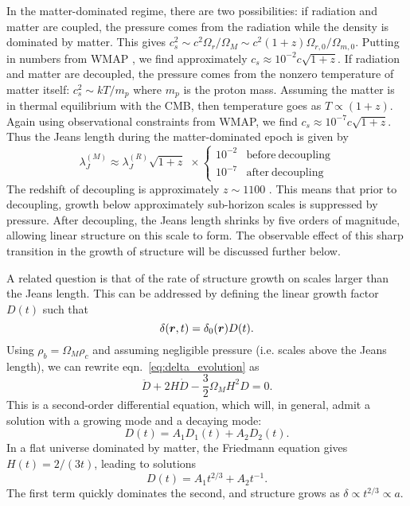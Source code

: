 In the matter-dominated regime, there are two possibilities: if radiation and
matter are coupled, the pressure comes from the radiation
while the density is dominated by matter.  This gives
$c_s^2 \sim c^2 \Omega_r / \Omega_M \sim c^2 (1 + z)
\Omega_{r,0}/\Omega_{m, 0}$.
Putting in numbers from WMAP \citep{WMAP7}, we find approximately
$c_s \approx 10^{-2} c \sqrt{1 + z}$.
If radiation and matter are decoupled, the pressure comes from the nonzero
temperature of matter itself:
$c_s^2 \sim kT/m_p$ where $m_p$ is the proton mass.  Assuming the matter
is in thermal equilibrium with the CMB, then temperature goes as
$T \propto (1 + z)$.  Again using observational constraints from WMAP, we find
$c_s \approx 10^{-7} c \sqrt{1 + z}$.  Thus the Jeans length during the
matter-dominated epoch is given by
\begin{equation}
  \label{eq:jeans_matter}
  \lambda_J^{(M)} \approx \lambda_J^{(R)}\sqrt{1 + z}\,\, \times \left\{
  \begin{array}{ll}
    10^{-2} & \mathrm{before\ decoupling}\\
    10^{-7} & \mathrm{after\ decoupling}
  \end{array}
  \right.
\end{equation}
The redshift of decoupling is approximately $z \sim 1100$ \citep[for a physical
argument for this, see][]{ryden2003cosmology}.  This means that prior to
decoupling, growth below approximately sub-horizon scales is suppressed by
pressure.  After decoupling, the Jeans length shrinks by five orders of
magnitude, allowing linear structure on this scale to form.  The observable
effect of this sharp transition in the growth of structure will be discussed
further below.

A related question is that of the rate of structure growth
on scales larger than the Jeans length. 
This can be addressed by defining the linear growth
factor $D(t)$ such that
\begin{equation}
  \label{eq:linear_growth_def}
  \delta(\boldsymbol{r}, t) = \delta_0(\boldsymbol{r})D(t).
\end{equation}
Using $\rho_b = \Omega_M\rho_c$ and assuming negligible pressure (i.e. scales
above the Jeans length), we can rewrite
eqn.~\ref{eq:delta_evolution} as
\begin{equation}
  \label{eq:linear_growth_eqn}
  \ddot{D} + 2H\dot{D} - \frac{3}{2}\Omega_M H^2D = 0.
\end{equation}
This is a second-order differential equation, which will, in general,
admit a solution with a growing mode and a decaying mode:
\begin{equation}
  D(t) = A_1 D_1(t) + A_2 D_2(t).
\end{equation}
In a flat universe dominated by matter, the
Friedmann equation gives $H(t) = 2 / (3t)$, leading to solutions
\begin{equation}
  D(t) = A_1 t^{2/3} + A_2 t^{-1}.
\end{equation}
The first term quickly dominates the second, and structure grows as
$\delta \propto t^{2/3} \propto a$.

